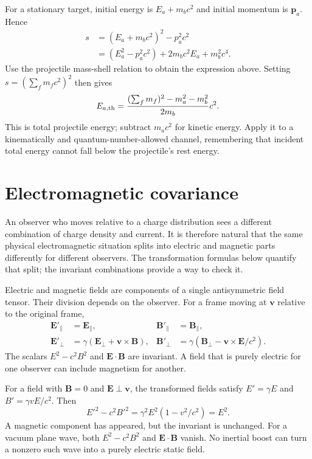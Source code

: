 \documentclass[11pt,oneside]{book}
\newcommand{\vect}[1]{\boldsymbol{#1}}
\theoremstyle{reviewstyle}
\begin{document}
For a stationary target, initial energy is $E_a+m_bc^2$ and initial momentum is $\vect p_a$. Hence
\begin{align}
s&=(E_a+m_bc^2)^2-p_a^2c^2\\
&=(E_a^2-p_a^2c^2)+2m_bc^2E_a+m_b^2c^4.
\end{align}
Use the projectile mass-shell relation to obtain the expression above. Setting $s=(\sum_fm_fc^2)^2$ then gives
\begin{equation}
E_{a,\rm th}=\frac{(\sum_fm_f)^2-m_a^2-m_b^2}{2m_b}c^2.
\end{equation}
This is total projectile energy; subtract $m_ac^2$ for kinetic energy. Apply it to a kinematically and quantum-number-allowed channel, remembering that incident total energy cannot fall below the projectile's rest energy.

\section{Electromagnetic covariance}
An observer who moves relative to a charge distribution sees a different combination of charge density and current. It is therefore natural that the same physical electromagnetic situation splits into electric and magnetic parts differently for different observers. The transformation formulas below quantify that split; the invariant combinations provide a way to check it.

Electric and magnetic fields are components of a single antisymmetric field tensor. Their division depends on the observer. For a frame moving at $\vect v$ relative to the original frame,
\begin{align}
\vect E'_\parallel&=\vect E_\parallel,&\vect B'_\parallel&=\vect B_\parallel,\\
\vect E'_\perp&=\gamma(\vect E_\perp+\vect v\times\vect B),&
\vect B'_\perp&=\gamma(\vect B_\perp-\vect v\times\vect E/c^2).
\end{align}
The scalars $E^2-c^2B^2$ and $\vect E\cdot\vect B$ are invariant. A field that is purely electric for one observer can include magnetism for another.

For a field with $\vect B=0$ and $\vect E\perp\vect v$, the transformed fields satisfy $E'=\gamma E$ and $B'=\gamma vE/c^2$. Then
\begin{equation}
E'^2-c^2B'^2=\gamma^2E^2(1-v^2/c^2)=E^2.
\end{equation}
A magnetic component has appeared, but the invariant is unchanged. For a vacuum plane wave, both $E^2-c^2B^2$ and $\vect E\cdot\vect B$ vanish. No inertial boost can turn a nonzero such wave into a purely electric static field.
\end{document}
